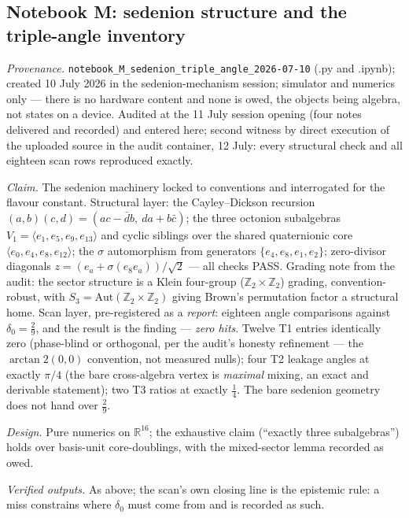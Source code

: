 \subsection{Notebook M: sedenion structure and the triple-angle inventory}
\label{app:nb-M}

\emph{Provenance.} \texttt{notebook\_M\_sedenion\_triple\_angle\_2026-07-10} (.py and .ipynb);
created 10 July 2026 in the sedenion-mechanism session; simulator and numerics only --- there is
no hardware content and none is owed, the objects being algebra, not states on a device. Audited
at the 11 July session opening (four notes delivered and recorded) and entered here; second
witness by direct execution of the uploaded source in the audit container, 12 July: every
structural check and all eighteen scan rows reproduced exactly.

\emph{Claim.} The sedenion machinery locked to conventions and interrogated for the flavour
constant. Structural layer: the Cayley--Dickson recursion
$(a,b)(c,d) = (ac - \bar d b,\ da + b\bar c)$; the three octonion subalgebras
$V_{1} = \langle e_{1}, e_{5}, e_{9}, e_{13}\rangle$ and cyclic siblings over the shared
quaternionic core $\langle e_{0}, e_{4}, e_{8}, e_{12}\rangle$; the $\sigma$ automorphism from
generators $\{e_{4}, e_{8}, e_{1}, e_{2}\}$; zero-divisor diagonals
$z = (e_{a} + \sigma(e_{8}e_{a}))/\sqrt2$ --- all checks PASS. Grading note from the audit: the
sector structure is a Klein four-group ($\mathbb{Z}_{2} \times \mathbb{Z}_{2}$) grading,
convention-robust, with $S_{3} = \mathrm{Aut}(\mathbb{Z}_{2} \times \mathbb{Z}_{2})$ giving
Brown's permutation factor a structural home. Scan layer, pre-registered as a \emph{report}:
eighteen angle comparisons against $\delta_{0} = \tfrac29$, and the result is the finding ---
\emph{zero hits}. Twelve T1 entries identically zero (phase-blind or orthogonal, per the audit's
honesty refinement --- the $\arctan2(0,0)$ convention, not measured nulls); four T2 leakage
angles at exactly $\pi/4$ (the bare cross-algebra vertex is \emph{maximal} mixing, an exact and
derivable statement); two T3 ratios at exactly $\tfrac14$. The bare sedenion geometry does not
hand over $\tfrac29$.

\emph{Design.} Pure numerics on $\mathbb{R}^{16}$; the exhaustive claim (``exactly three
subalgebras'') holds over basis-unit core-doublings, with the mixed-sector lemma recorded as
owed.

\emph{Verified outputs.} As above; the scan's own closing line is the epistemic rule: a miss
constrains where $\delta_{0}$ must come from and is recorded as such.

